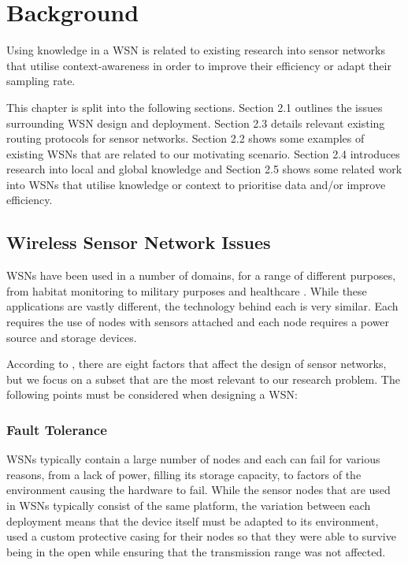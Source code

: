 \chapter{Background}
Using knowledge in a WSN is related to existing research into sensor networks that utilise context-awareness in order to improve their efficiency or adapt their sampling rate. 

This chapter is split into the following sections. Section 2.1 outlines the issues surrounding WSN design and deployment. 
Section 2.3 details relevant existing routing protocols for sensor networks. Section 2.2 shows some examples of existing WSNs that are related to our motivating scenario. Section 2.4 introduces research into local and global knowledge and Section 2.5 shows some related work into WSNs that utilise knowledge or context to prioritise data and/or improve efficiency.

\section{Wireless Sensor Network Issues}

WSNs have been used in a number of domains, for a range of different purposes, from habitat monitoring \cite{Szewczyk2004a} to military purposes \cite{Pizzocaro} and healthcare \cite{Otto2006}. While these applications are vastly different, the technology behind each is very similar. Each requires the use of nodes with sensors attached and each node requires a power source and storage devices.

According to \cite{Akyildiz2002}, there are eight factors that affect the design of sensor networks, but we focus on a subset that are the most relevant to our research problem. The following points must be considered when designing a WSN:

\subsection{Fault Tolerance}
	WSNs typically contain a large number of nodes and each can fail for various reasons, from a lack of power, filling its storage capacity, to factors of the environment causing the hardware to fail. While the sensor nodes that are used in WSNs typically consist of the same platform, the variation between each deployment means that the device itself must be adapted to its environment, \cite{Mainwaring2002} used a custom protective casing for their nodes so that they were able to survive being in the open while ensuring that the transmission range was not affected.


